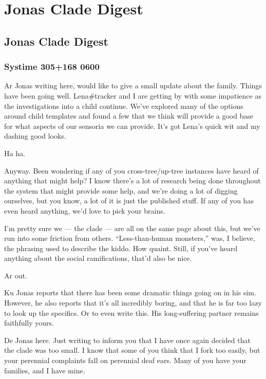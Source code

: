 \chapter{Jonas Clade Digest}

\hypertarget{jonas-clade-digest}{%
\section*{Jonas Clade Digest}\label{jonas-clade-digest}}

\hypertarget{systime-305168-0600}{%
\subsection*{Systime 305+168 0600}\label{systime-305168-0600}}

Ar Jonas writing here, would like to give a small update about the family. Things have been going well. Lena\#tracker and I are getting by with some impatience as the investigations into a child continue. We've explored many of the options around child templates and found a few that we think will provide a good base for what aspects of our sensoria we can provide. It's got Lena's quick wit and my dashing good looks.

Ha ha.

Anyway. Been wondering if any of you cross-tree/up-tree instances have heard of anything that might help? I know there's a lot of research being done throughout the system that might provide some help, and we're doing a lot of digging ourselves, but you know, a lot of it is just the published stuff. If any of you has even heard anything, we'd love to pick your brains.

I'm pretty sure we --- the clade --- are all on the same page about this, but we've run into some friction from others. ``Less-than-human monsters,'' was, I believe, the phrasing used to describe the kiddo. How quaint. Still, if you've heard anything about the social ramifications, that'd also be nice.

Ar out.

\secdiv{}

\noindent Ku Jonas reports that there has been some dramatic things going on in his sim. However, he also reports that it's all incredibly boring, and that he is far too lazy to look up the specifics. Or to even write this. His long-suffering partner remains faithfully yours.

\secdiv{}

\noindent De Jonas here. Just writing to inform you that I have once again decided that the clade was too small. I know that some of you think that I fork too easily, but your perennial complaints fall on perennial deaf ears. Many of you have your families, and I have mine.

